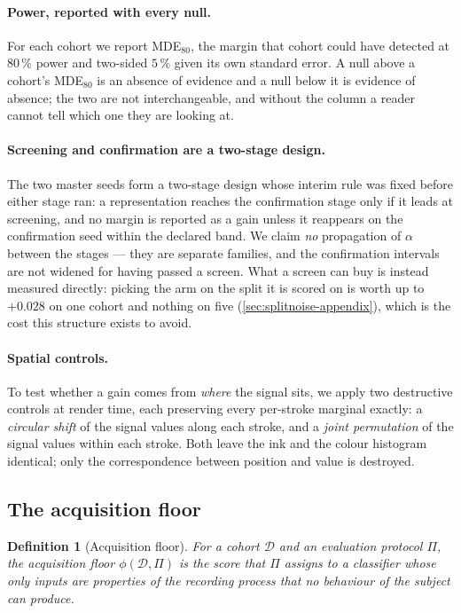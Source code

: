 \documentclass[10pt,a4paper]{article}
\newtheorem{definition}{Definition}
\begin{document}
\paragraph{Power, reported with every null.} For each cohort we report MDE$_{80}$, the margin that
cohort could have detected at $80\,\%$ power and two-sided $5\,\%$ given its own standard error. A
null above a cohort's MDE$_{80}$ is an absence of evidence and a null below it is evidence of
absence; the two are not interchangeable, and without the column a reader cannot tell which one they
are looking at.

\paragraph{Screening and confirmation are a two-stage design.} The two master seeds form a
two-stage design whose interim rule was fixed before either stage ran: a representation reaches the
confirmation stage only if it leads at screening, and no margin is reported as a gain unless it
reappears on the confirmation seed within the declared band. We claim \emph{no} propagation of
$\alpha$ between the stages --- they are separate families, and the confirmation intervals are not
widened for having passed a screen. What a screen can buy is instead measured directly: picking the
arm on the split it is scored on is worth up to $+0.028$ on one cohort and nothing on five
(\cref{sec:splitnoise-appendix}), which is the cost this structure exists to avoid.

\paragraph{Spatial controls.} To test whether a gain comes from \emph{where} the signal sits, we
apply two destructive controls at render time, each preserving every per-stroke marginal exactly:
a \emph{circular shift} of the signal values along each stroke, and a \emph{joint permutation} of
the signal values within each stroke. Both leave the ink and the colour histogram identical; only
the correspondence between position and value is destroyed.

\subsection{The acquisition floor}
\label{sec:floor}


\begin{definition}[Acquisition floor]
For a cohort $\mathcal{D}$ and an evaluation protocol $\Pi$, the acquisition floor
$\phi(\mathcal{D}, \Pi)$ is the score that $\Pi$ assigns to a classifier whose only inputs are
properties of the recording process that no behaviour of the subject can produce.
\end{definition}
\end{document}
